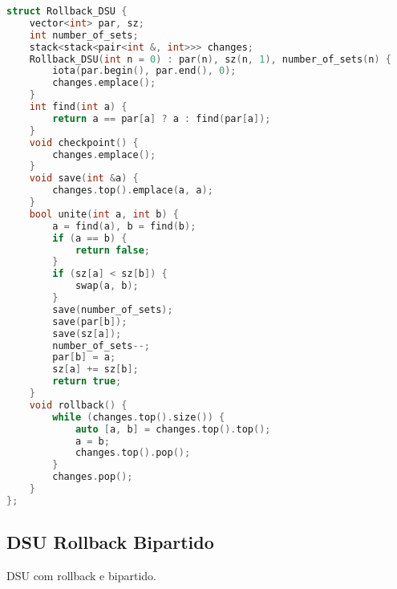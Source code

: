 \documentclass[11pt, a4paper, oneside]{book}
\begin{document}
\begin{multicols}{2}
\begin{lstlisting}[language=C++]
struct Rollback_DSU {
    vector<int> par, sz;
    int number_of_sets;
    stack<stack<pair<int &, int>>> changes;
    Rollback_DSU(int n = 0) : par(n), sz(n, 1), number_of_sets(n) {
        iota(par.begin(), par.end(), 0);
        changes.emplace();
    }
    int find(int a) {
        return a == par[a] ? a : find(par[a]);
    }
    void checkpoint() {
        changes.emplace();
    }
    void save(int &a) {
        changes.top().emplace(a, a);
    }
    bool unite(int a, int b) {
        a = find(a), b = find(b);
        if (a == b) {
            return false;
        }
        if (sz[a] < sz[b]) {
            swap(a, b);
        }
        save(number_of_sets);
        save(par[b]);
        save(sz[a]);
        number_of_sets--;
        par[b] = a;
        sz[a] += sz[b];
        return true;
    }
    void rollback() {
        while (changes.top().size()) {
            auto [a, b] = changes.top().top();
            a = b;
            changes.top().pop();
        }
        changes.pop();
    }
};\end{lstlisting}
\end{multicols}

\hfill

\subsection{DSU Rollback Bipartido}


DSU com rollback e bipartido.

\hfill
\end{document}
